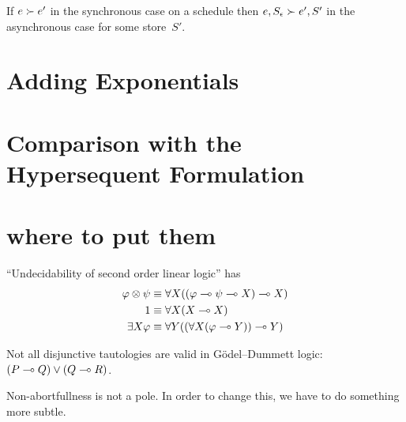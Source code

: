 \begin{proposition}
 If $e\succ e'$ in the synchronous case on a schedule then $e, S_\epsilon \succ e', S'$
 in the asynchronous case for some store~$S'$.
\end{proposition}


\section{Adding Exponentials}

\section{Comparison with the Hypersequent Formulation}


\section*{where to put them}

``Undecidability of second order linear logic'' has
\begin{align*}
 \varphi\otimes \psi&\equiv \forall X((\varphi\multimap\psi\multimap X)\multimap X) \\
 {1}      &\equiv \forall X(X\multimap X)\\
 \exists X\varphi   &\equiv \forall Y((\forall X(\varphi\multimap Y))\multimap Y)
\end{align*}

Not all disjunctive tautologies are valid in G\"odel--Dummett logic:
$(P\multimap Q)\lor(Q\multimap R)$.

Non-abortfullness is not a pole.
In order to change this, we have to do something more subtle.
